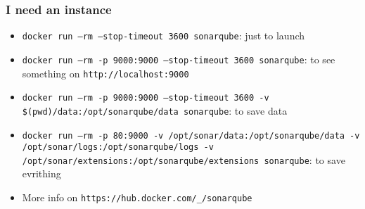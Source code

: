\subsubsection{I need an instance}
\begin{frame}[fragile]{\subsubsecname}
  \begin{itemize}
    \item \texttt{docker run --rm --stop-timeout 3600 sonarqube}: just to launch
    \item \texttt{docker run --rm -p 9000:9000 --stop-timeout 3600 sonarqube}: to see something on \texttt{http://localhost:9000}
    \item \texttt{docker run --rm -p 9000:9000 --stop-timeout 3600 -v \$(pwd)/data:/opt/sonarqube/data sonarqube}: to save data
    \item \texttt{docker run --rm -p 80:9000 -v /opt/sonar/data:/opt/sonarqube/data -v /opt/sonar/logs:/opt/sonarqube/logs -v /opt/sonar/extensions:/opt/sonarqube/extensions sonarqube}: to save evrithing
    \item More info on \texttt{https://hub.docker.com/\_/sonarqube}
  \end{itemize}
\end{frame}
